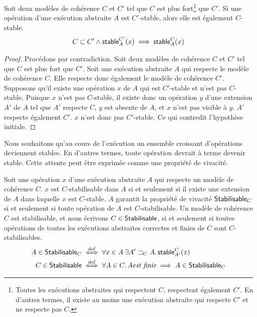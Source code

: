 
\begin{theorem}\label{th:stability-hierarchy}
Soit deux modèles de cohérence $C$ et $C'$ tel que $C$ est plus fort\footnote{Toutes les exécutions abstraites qui respectent $C$, respectent également $C'$. En d'autres termes, il existe au moins une exécution abstraite qui respecte $C'$ et ne respecte pas $C$.} que $C'$.
Si une opération d'une exécution abstraite $A$ est $C'$-stable, alors elle est également $C$-stable.
\begin{equation*}
    C \subset C' \land \operatorname{\mathsf{stable}}_A^{C'}(x) \implies \operatorname{\mathsf{stable}}_A^{C}(x)
\end{equation*}
\end{theorem}

\begin{proof}
Procédons par contradiction.
Soit deux modèles de cohérence $C$ et $C'$ tel que $C$ est plus fort que $C'$.
Soit une exécution abstraite $A$ qui respecte le modèle de cohérence $C$.
Elle respecte donc également le modèle de cohérence $C'$.
Supposons qu'il existe une opération $x$ de $A$ qui est $C'$-stable et n'est pas $C$-stable.
Puisque $x$ n'est pas $C$-stable, il existe donc un opération $y$ d'une extension $A'$ de $A$ tel que $A'$ respecte $C$, $y$ est absente de $A$, et $x$ n'est pas visible à $y$.
$A'$ respecte également $C'$.
$x$ n'est donc pas $C'$-stable.
Ce qui contredit l'hypothèse initiale.
\end{proof}

Nous souhaitons qu'au cours de l'exécution un ensemble croissant d'opérations deviennent stables.
En d'autres termes, toute opération devrait à terme devenir stable.
Cette attente peut être exprimée comme une propriété de vivacité.

\begin{definition}
Soit une opération $x$ d'une exécution abstraite $A$ qui respecte un modèle de cohérence $C$.
$x$ est $C$-stabilisable dans $A$ si et seulement si il existe une extension de $A$ dans laquelle $x$ est $C$-stable.
$A$ garantit la propriété de vivacité $\operatorname{\mathsf{Stabilisable}}_C$ si et seulement si toute opération de $A$ est $C$-stabilisable.
Un modèle de cohérence $C$ est stabilisable, et nous écrivons $C \in \operatorname{\mathsf{Stabilisable}}$, si et seulement si toutes opérations de toutes les exécutions abstraites correctes et finies de $C$ sont $C$-stabilisables.
\begin{align*}
    A \in \operatorname{\mathsf{Stabilisable}}_C &\overset{\mathrm{def}}{\iff} \forall x \in A \:\exists A' \sqsupset_C A \ldotp \operatorname{\mathsf{stable}}_{A'}^C(x)\\
    C \in \operatorname{\mathsf{Stabilisable}} &\overset{\mathrm{def}}{\iff} \forall A \in C \ldotp A \textit{est finie} \implies A \in \operatorname{\mathsf{Stabilisable}}_C
\end{align*}
\end{definition}

